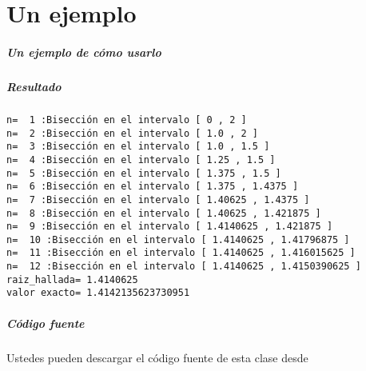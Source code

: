 \documentclass[11pt]{beamer}
\def\azul{\color{blue}}
\def\rojo{\color{red}}
\begin{document}
\part{Un ejemplo}

\frame{\partpage}


\begin{frame}

\frametitle{Un ejemplo de cómo usarlo}



\end{frame}

\begin{frame}[fragile]
\frametitle{Resultado}

{\azul 
\begin{verbatim}
n=  1 :Bisección en el intervalo [ 0 , 2 ]
n=  2 :Bisección en el intervalo [ 1.0 , 2 ]
n=  3 :Bisección en el intervalo [ 1.0 , 1.5 ]
n=  4 :Bisección en el intervalo [ 1.25 , 1.5 ]
n=  5 :Bisección en el intervalo [ 1.375 , 1.5 ]
n=  6 :Bisección en el intervalo [ 1.375 , 1.4375 ]
n=  7 :Bisección en el intervalo [ 1.40625 , 1.4375 ]
n=  8 :Bisección en el intervalo [ 1.40625 , 1.421875 ]
n=  9 :Bisección en el intervalo [ 1.4140625 , 1.421875 ]
n=  10 :Bisección en el intervalo [ 1.4140625 , 1.41796875 ]
n=  11 :Bisección en el intervalo [ 1.4140625 , 1.416015625 ]
n=  12 :Bisección en el intervalo [ 1.4140625 , 1.4150390625 ]
raiz_hallada= 1.4140625
valor exacto= 1.4142135623730951

\end{verbatim}
}
\end{frame}

\begin{frame}

\frametitle{Código fuente}

{\Large

Ustedes pueden descargar el código fuente de esta clase desde

\bigskip

\rojo{
\begin{url}
https://github.com/pdenapo/metodos-numericos
\end{url}
}}

\end{frame}
\end{document}
